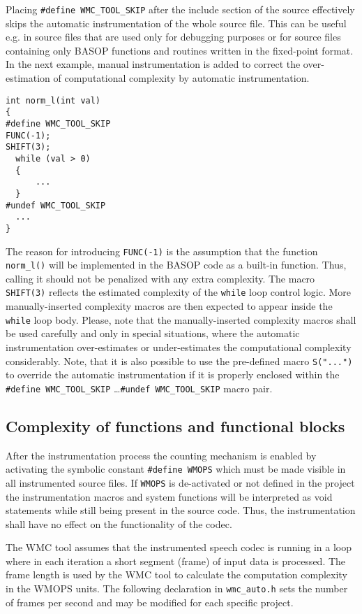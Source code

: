 Placing \verb|#define WMC_TOOL_SKIP| after the include section of the source effectively skips the automatic instrumentation of the whole source file. This can be useful e.g. in source files that are used only for debugging purposes or for source files containing only BASOP functions and routines written in the fixed-point format. In the next example, manual instrumentation is added to correct the over-estimation of computational complexity by automatic instrumentation.

\begin{Verbatim}[fontsize=\small]
int norm_l(int val)
{
#define WMC_TOOL_SKIP
FUNC(-1);
SHIFT(3);
  while (val > 0)
  {
      ...
  }
#undef WMC_TOOL_SKIP
  ...
}
\end{Verbatim}

The reason for introducing \verb|FUNC(-1)| is the assumption that the function \verb|norm_l()| will be implemented in the BASOP code as a built-in function. Thus, calling it should not be penalized with any extra complexity. The macro \verb|SHIFT(3)| reflects the estimated complexity of the \verb|while| loop control logic. More manually-inserted complexity macros are then expected to appear inside the \verb|while| loop body. Please, note that the manually-inserted complexity macros shall be used carefully and only in special situations, where the automatic instrumentation over-estimates or under-estimates the computational complexity considerably. Note, that it is also possible to use the pre-defined macro \verb|S("...")| to override the automatic instrumentation if it is properly enclosed within the \verb|#define WMC_TOOL_SKIP| \ldots \verb|#undef WMC_TOOL_SKIP| macro pair.

\subsection{Complexity of functions and functional blocks}

After the instrumentation process the counting mechanism is enabled by activating the symbolic constant \verb|#define WMOPS| which must be made visible in all instrumented source files. If \verb|WMOPS| is de-activated or not defined in the project the instrumentation macros and system functions will be interpreted as void statements while still being present in the source code. Thus, the instrumentation shall have no effect on the functionality of the codec.

The WMC tool assumes that the instrumented speech codec is running in a loop where in each iteration a short segment (frame) of input data is processed. The frame length is used by the WMC tool to calculate the computation complexity in the WMOPS units. The following declaration in \verb|wmc_auto.h| sets the number of frames per second and may be modified for each specific project.

